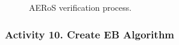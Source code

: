 \documentclass[runningheads]{llncs}
\begin{document}
\begin{figure}[!h]
\begin{minipage}{.5\textwidth}
		\vspace{-2ex}
		\caption{AERoS verification process.}
		\label{amlas-a-stage5}
	\end{minipage}
	\vspace{-4ex}
\end{figure}





\subsubsection*{Activity 10. Create EB Algorithm}
\end{document}
